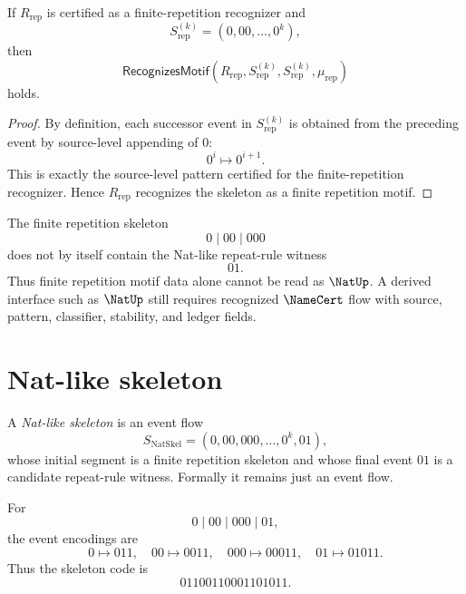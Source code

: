 \begin{proposition}
\label{prop:case-studies-repetition-skeleton-has-motif}
If $R_{\mathrm{rep}}$ is certified as a finite-repetition recognizer and
$$
  S_{\mathrm{rep}}^{(k)}=(0,00,\ldots,0^k),
$$
then
$$
  \mathsf{RecognizesMotif}
  (R_{\mathrm{rep}},S_{\mathrm{rep}}^{(k)},S_{\mathrm{rep}}^{(k)},\mu_{\mathrm{rep}})
$$
holds.
\end{proposition}

\begin{proof}
By definition, each successor event in $S_{\mathrm{rep}}^{(k)}$ is obtained from the preceding event by source-level appending of $0$:
$$
  0^i\mapsto 0^{i+1}.
$$
This is exactly the source-level pattern certified for the finite-repetition recognizer. Hence $R_{\mathrm{rep}}$ recognizes the skeleton as a finite repetition motif.
\end{proof}

\begin{corollary}
\label{cor:case-studies-repetition-not-nat}
The finite repetition skeleton
$$
  0\mid 00\mid 000
$$
does not by itself contain the Nat-like repeat-rule witness
$$
  01.
$$
Thus finite repetition motif data alone cannot be read as $\NatUp$. A derived interface such as $\NatUp$ still requires recognized $\NameCert$ flow with source, pattern, classifier, stability, and ledger fields.
\end{corollary}

\section{Nat-like skeleton}
\label{sec:case-studies-nat-like}

\begin{definition}
\label{def:case-studies-nat-like-skeleton}
A \emph{Nat-like skeleton} is an event flow
$$
  S_{\mathrm{NatSkel}}
  =
  (0,00,000,\ldots,0^k,01),
$$
whose initial segment is a finite repetition skeleton and whose final event $01$ is a candidate repeat-rule witness. Formally it remains just an event flow.
\end{definition}

\begin{example}
\label{ex:case-studies-nat-like-code}
For
$$
  0\mid 00\mid 000\mid 01,
$$
the event encodings are
$$
  0\mapsto 011,\quad
  00\mapsto 0011,\quad
  000\mapsto 00011,\quad
  01\mapsto 01011.
$$
Thus the skeleton code is
$$
  01100110001101011.
$$
\end{example}

